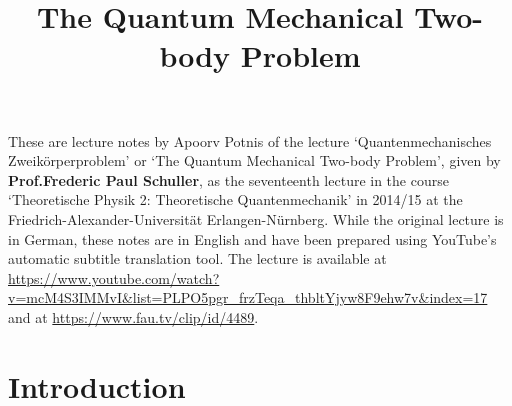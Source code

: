 \documentclass[12pt, a4 paper]{article}
\title{The Quantum Mechanical Two-body Problem}
\author{}
\date{\vspace{-5ex}}
\theoremstyle{definition}
\begin{document}
	\maketitle

	These are lecture notes by Apoorv Potnis of the lecture `Quantenmechanisches Zweikörperproblem' or `The Quantum Mechanical Two-body Problem', given by \textbf{Prof.\@ Frederic Paul Schuller}, as the seventeenth lecture in the course `Theoretische Physik 2: Theoretische Quantenmechanik' in 2014/15 at the Friedrich-Alexander-Universität Erlangen-Nürnberg. While the original lecture is in German, these notes are in English and have been prepared using YouTube's automatic subtitle translation tool. The lecture is available at \url{https://www.youtube.com/watch?v=mcM4S3IMMvI&list=PLPO5pgr_frzTeqa_thbltYjyw8F9ehw7v&index=17} and at \url{https://www.fau.tv/clip/id/4489}.

	\tableofcontents

	\section{Introduction}
\end{document}
